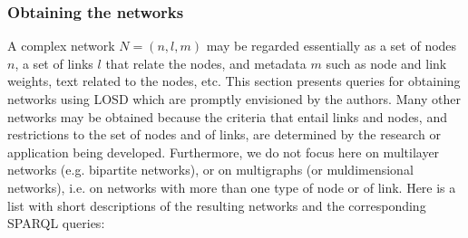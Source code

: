 \documentclass[data,datadescriptor,submit,moreauthors,pdftex]{Definitions/mdpi}
\begin{document}
\subsubsection{Obtaining the networks}\label{snet}
A complex network $N=(n,l,m)$ may be regarded essentially as
a set of nodes $n$, a set of links $l$ that relate the nodes,
and metadata $m$ such as node and link weights, text related to the nodes, etc.
This section presents queries for obtaining networks using LOSD
which are promptly envisioned by the authors.
Many other networks may be obtained because the criteria that entail
links and nodes, and restrictions to the set of nodes and of links,
are determined by the research or application being developed.
Furthermore, we do not focus here on multilayer networks (e.g. bipartite networks),
or on multigraphs (or muldimensional networks),
i.e. on networks with more than one type of node or of link.
Here is a list with short descriptions of the resulting networks and the corresponding SPARQL queries:
\end{document}
